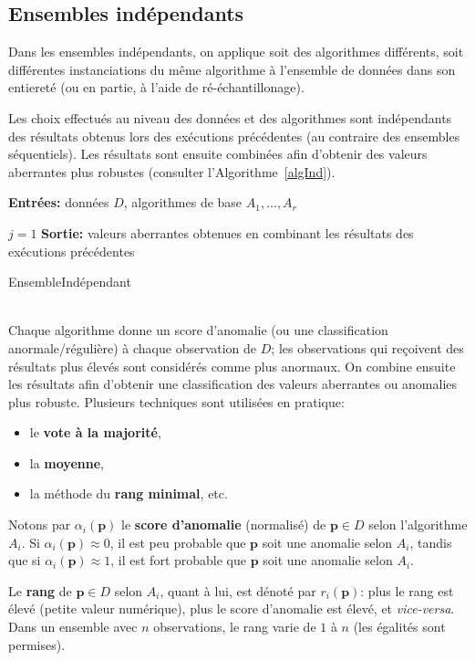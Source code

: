 \subsection*{Ensembles ind\'ependants}
Dans les ensembles ind\'ependants, on applique soit des algorithmes diff\'erents, soit  différentes instanciations
du même algorithme \`a l'ensemble de donn\'ees dans son entieret\'e (ou en partie, \`a l'aide de r\'e-\'echantillonage). \par Les choix effectu\'es au niveau des  données
et des algorithmes sont indépendants des résultats obtenus lors des ex\'ecutions pr\'ec\'edentes (au contraire des ensembles s\'equentiels). Les résultats sont ensuite combinées afin d'obtenir des valeurs aberrantes plus robustes (consulter l'Algorithme~\ref{algInd}).

\begin{algorithm}[t]
\SetAlgoLined
\textbf{Entr\'ees:} données $D$, algorithmes de base $A_1,\ldots,A_r$ 

$j=1$\;
\textbf{Sortie:} valeurs aberrantes obtenues en combinant les résultats des exécutions précédentes 
\caption{EnsembleInd\'ependant}\label{algInd}
\end{algorithm}
\ \\
\noindent Chaque algorithme donne un score d'anomalie (ou une classification anormale/r\'eguli\`ere) \`a chaque observation de $D$; les observations qui reçoivent des résultats plus élevés sont considérés comme plus anormaux. On combine ensuite les résultats afin d'obtenir une classification des valeurs aberrantes ou anomalies plus robuste. Plusieurs techniques sont utilisées en pratique: \begin{itemize}[noitemsep]
\item le \textbf{vote à la majorité}, 
\item la \textbf{moyenne}, 
\item la m\'ethode du \textbf{rang minimal}, etc. \end{itemize}  Notons par $\alpha_i(\mathbf{p})$ le \textbf{score d'anomalie} (normalisé) de $\mathbf{p}\in D$ selon
l'algorithme $A_i$. Si $\alpha_i(\mathbf{p})\approx 0$, il est peu probable que $\mathbf{p}$ soit une anomalie selon $A_i$, tandis que si $\alpha_i(\mathbf{p})\approx 1$, il est fort probable que $\mathbf{p}$ soit une anomalie selon $A_i$. \par Le \textbf{rang} de $\mathbf{p}\in D$ selon $A_i$, quant \`a lui, est d\'enot\'e par $r_i(\mathbf{p})$: plus le rang est \'elev\'e (petite valeur num\'erique), plus le score d'anomalie est \'elev\'e, et \textit{vice-versa}. Dans un ensemble avec $n$ observations, le rang varie de $1$ \`a $n$ (les \'egalit\'es sont permises). 
